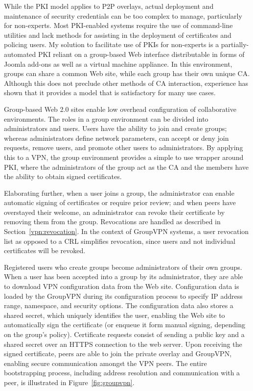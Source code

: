 While the PKI model applies to P2P overlays, actual deployment and maintenance
of security credentials can be too complex to manage, particularly for
non-experts.  Most PKI-enabled systems require the use of command-line
utilities and lack methods for assisting in the deployment of certificates and
policing users.  My solution to facilitate use of PKIs for non-experts is a
partially-automated PKI reliant on a group-based Web interface distributable in
forms of Joomla add-ons as well as a virtual machine appliance.  In this
environment, groups can share a common Web site, while each group has their own
unique CA.  Although this does not preclude other methods of CA interaction,
experience has shown that it provides a model that is satisfactory for many use
cases.

Group-based Web 2.0 sites enable low overhead configuration of collaborative
environments.  The roles in a group environment can be divided into
administrators and users.  Users have the ability to join and create groups;
whereas administrators define network parameters, can accept or deny join
requests, remove users, and promote other users to administrators.  By applying
this to a VPN, the group environment provides a simple to use wrapper around
PKI, where the administrators of the group act as the CA and the members have
the ability to obtain signed certificates.  

Elaborating further, when a user joins a group, the administrator can enable
automatic signing of certificates or require prior review; and when peers have
overstayed their welcome, an administrator can revoke their certificate by
removing them from the group.  Revocations are handled as described in
Section~\ref{vpn:revocation}.  In the context of GroupVPN systems, a user
revocation list as opposed to a CRL simplifies revocation, since users and not
individual certificates will be revoked.

Registered users who create groups become administrators of their own groups.
When a user has been accepted into a group by its administrator, they are able
to download VPN configuration data from the Web site.  Configuration data is
loaded by the GroupVPN during its configuration process to specify IP address
range, namespace, and security options.  The configuration data also stores a
shared secret, which uniquely identifies the user, enabling the Web site to
automatically sign the certificate (or enqueue it form manual signing,
depending on the group's policy).  Certificate requests consist of sending a
public key and a shared secret over an HTTPS connection to the web server.
Upon receiving the signed certificate, peers are able to join the private
overlay and GroupVPN, enabling secure communication amongst the VPN peers.  The
entire bootstrapping process, including address resolution and communication
with a peer, is illustrated in Figure~\ref{fig:groupvpn}.

